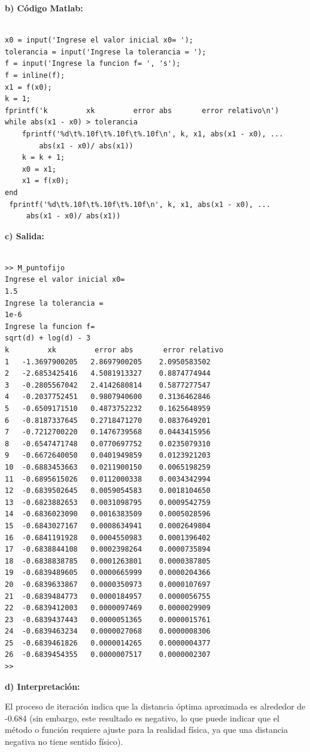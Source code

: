 \documentclass[12pt,a4paper,twoside]{article}  %
\begin{document}
\textbf{b) Código Matlab:}

\begin{lstlisting}

x0 = input('Ingrese el valor inicial x0= ');
tolerancia = input('Ingrese la tolerancia = ');
f = input('Ingrese la funcion f= ', 's');
f = inline(f);
x1 = f(x0);
k = 1;
fprintf('k         xk         error abs       error relativo\n')
while abs(x1 - x0) > tolerancia
    fprintf('%d\t%.10f\t%.10f\t%.10f\n', k, x1, abs(x1 - x0), ...
        abs(x1 - x0)/ abs(x1))
    k = k + 1;
    x0 = x1;
    x1 = f(x0);
end
 fprintf('%d\t%.10f\t%.10f\t%.10f\n', k, x1, abs(x1 - x0), ...
     abs(x1 - x0)/ abs(x1))

\end{lstlisting}

\textbf{c) Salida:}

\begin{verbatim}

>> M_puntofijo
Ingrese el valor inicial x0= 
1.5
Ingrese la tolerancia = 
1e-6
Ingrese la funcion f= 
sqrt(d) + log(d) - 3
k         xk         error abs       error relativo
1	-1.3697900205	2.8697900205	2.0950583502
2	-2.6853425416	4.5081913327	0.8874774944
3	-0.2805567042	2.4142680814	0.5877277547
4	-0.2037752451	0.9807940600	0.3136462846
5	-0.6509171510	0.4873752232	0.1625648959
6	-0.8187337645	0.2718471270	0.0837649201
7	-0.7212700220	0.1476739568	0.0443415956
8	-0.6547471748	0.0770697752	0.0235079310
9	-0.6672640050	0.0401949859	0.0123921203
10	-0.6883453663	0.0211900150	0.0065198259
11	-0.6895615026	0.0112000338	0.0034342994
12	-0.6839502645	0.0059054583	0.0018104650
13	-0.6823882653	0.0031098795	0.0009542759
14	-0.6836023090	0.0016383509	0.0005028596
15	-0.6843027167	0.0008634941	0.0002649804
16	-0.6841191928	0.0004550983	0.0001396402
17	-0.6838844108	0.0002398264	0.0000735894
18	-0.6838838785	0.0001263801	0.0000387805
19	-0.6839489605	0.0000665999	0.0000204366
20	-0.6839633867	0.0000350973	0.0000107697
21	-0.6839484773	0.0000184957	0.0000056755
22	-0.6839412003	0.0000097469	0.0000029909
23	-0.6839437443	0.0000051365	0.0000015761
24	-0.6839463234	0.0000027068	0.0000008306
25	-0.6839461826	0.0000014265	0.0000004377
26	-0.6839454355	0.0000007517	0.0000002307
>> 

\end{verbatim}

\textbf{d) Interpretación:}

El proceso de iteración indica que la distancia óptima aproximada es alrededor de -0.684 (sin embargo, este resultado es negativo, lo que puede indicar que el método o función requiere ajuste para la realidad física, ya que una distancia negativa no tiene sentido físico).
\end{document}
